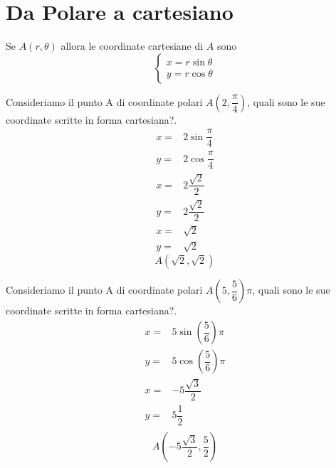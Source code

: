 \section{Da Polare a cartesiano}
Se $A(r,\theta)$ allora le coordinate cartesiane di $A$ sono\[\begin{cases}
x=r\sin\theta\\
y=r\cos\theta 
\end{cases} \]
\begin{esempiot}{}{} Consideriamo il punto A di coordinate polari $A(2,\dfrac{\pi}{4})$, quali sono le sue coordinate scritte in forma cartesiana?.
	\begin{align*}
	x=&2\sin\dfrac{\pi}{4}\\
	y=&2\cos\dfrac{\pi}{4}\\
	x=&2\dfrac{\sqrt{2}}{2}\\
	y=&2\dfrac{\sqrt{2}}{2}\\
	x=&\sqrt{2}\\
	y=&\sqrt{2}
	\end{align*}
	\[A(\sqrt{2},\sqrt{2}) \]
\end{esempiot}
\begin{esempiot}{}{} Consideriamo il punto A di coordinate polari $A(5,\dfrac{5}{6})\pi$, quali sono le sue coordinate scritte in forma cartesiana?.
	\begin{align*}
	x=&5\sin\left(\dfrac{5}{6}\right)\pi\\
	y=&5\cos\left(\dfrac{5}{6}\right)\pi\\
	x=&-5\dfrac{\sqrt{3}}{2}\\
	y=&5\dfrac{1}{2}\\
		\end{align*}
	\[A(-5\dfrac{\sqrt{3}}{2},\dfrac{5}{2}) \]
\end{esempiot}